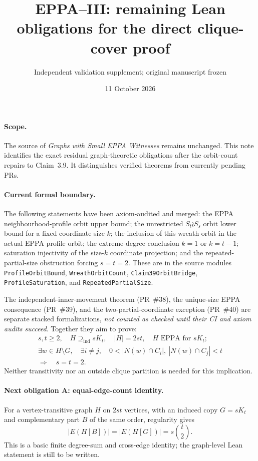 \documentclass[11pt,a4paper]{article}
\title{EPPA--III: remaining Lean obligations for the direct clique-cover proof}
\author{Independent validation supplement; original manuscript frozen}
\date{11 October 2026}
\begin{document}
\maketitle

\paragraph{Scope.}
The source of \emph{Graphs with Small EPPA Witnesses} remains
unchanged. This note identifies the exact residual graph-theoretic
obligations after the orbit-count repairs to Claim~3.9.
It distinguishes verified theorems from currently pending PRs.

\paragraph{Current formal boundary.}
The following statements have been axiom-audited and merged:
the EPPA neighbourhood-profile orbit upper bound;
the unrestricted \(S_t\wr S_s\) orbit lower bound for a fixed
coordinate size \(k\); the inclusion of this wreath orbit in the
actual EPPA profile orbit; the extreme-degree conclusion
\(k=1\) or \(k=t-1\); saturation injectivity of the
size-\(k\) coordinate projection; and the repeated-partial-size
obstruction forcing \(s=t=2\).
These are in the source modules
\texttt{ProfileOrbitBound},
\texttt{WreathOrbitCount},
\texttt{Claim39OrbitBridge},
\texttt{ProfileSaturation}, and
\texttt{RepeatedPartialSize}.

The independent-inner-movement theorem (PR~\#38),
the unique-size EPPA consequence (PR~\#39),
and the two-partial-coordinate exception (PR~\#40)
are separate stacked formalizations,
\emph{not counted as checked until their CI and axiom
audits succeed}. Together they aim to prove:
\[
 \begin{gathered}
 s,t\ge2,\quad H\supseteq_{\mathrm{ind}}sK_t,\quad
 |H|=2st,\quad H\text{ EPPA for }sK_t;\\
 \exists w\in H\setminus G,\quad
 \exists i\ne j,\quad
 0<|N(w)\cap C_i|,\ |N(w)\cap C_j|<t\\
 \Longrightarrow\quad s=t=2.
 \end{gathered}
\]
Neither transitivity nor an outside clique partition is needed
for this implication.

\paragraph{Next obligation A: equal-edge-count identity.}
For a vertex-transitive graph \(H\) on \(2st\) vertices, with
an induced copy \(G=sK_t\) and complementary part \(B\) of
the same order, regularity gives
\[
 |E(H[B])|=|E(H[G])|=s\binom t2.
 \tag{A}
\]
This is a basic finite degree-sum and cross-edge identity;
the graph-level Lean statement is still to be written.
\end{document}

